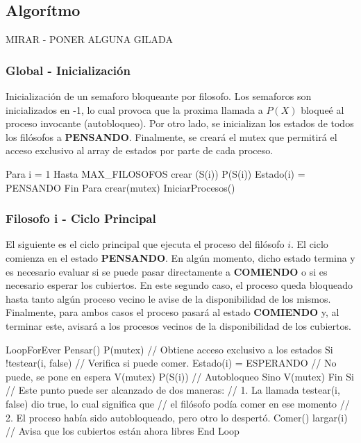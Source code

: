 \subsection{Algorítmo}
MIRAR - PONER ALGUNA GILADA

\subsubsection{Global - Inicialización}
Inicialización de un semaforo bloqueante por filosofo. Los semaforos son inicializados en -1,
lo cual provoca que la proxima llamada a $P(X)$ bloqueé al proceso invocante (autobloqueo).
Por otro lado, se inicializan los estados de todos los filósofos a {\bf PENSANDO}.
Finalmente, se crear\'a el mutex que permitirá el acceso exclusivo al array de estados por parte de cada proceso.

\begin{scriptsize} 
\begin{verbatimtab} 
	Para i = 1 Hasta MAX_FILOSOFOS
		crear (S(i))
		P(S(i))
		Estado(i) = PENSANDO
	Fin Para
	crear(mutex)
	IniciarProcesos()	
\end{verbatimtab}
\end{scriptsize}

\subsubsection{Filosofo i - Ciclo Principal}
El siguiente es el ciclo principal que ejecuta el proceso del filósofo $i$. El ciclo comienza en el estado {\bf PENSANDO}. 
En algún momento, dicho estado termina y es necesario evaluar si se puede pasar directamente a 
{\bf COMIENDO} o si es necesario esperar los cubiertos.  En este segundo caso, el proceso queda bloqueado 
hasta tanto algún proceso vecino le avise de la disponibilidad de los mismos. Finalmente, para ambos 
casos el proceso pasará al estado {\bf COMIENDO} y, al terminar este, avisará a los procesos vecinos 
de la disponibilidad de los cubiertos.

\begin{scriptsize} 
\begin{verbatimtab} 
	LoopForEver
		Pensar()			
		P(mutex)			        // Obtiene acceso exclusivo a los estados
		Si !testear(i, false)		// Verifica si puede comer. 
			Estado(i) = ESPERANDO	// No puede, se pone en espera
			V(mutex)
			P(S(i))			        // Autobloqueo
		Sino
			V(mutex)
		Fin Si		
		// Este punto puede ser alcanzado de dos maneras: 
		// 1. La llamada testear(i, false) dio true, lo cual significa que 
		// el filósofo podía comer en ese momento
		// 2. El proceso había sido autobloqueado, pero otro lo despertó.
		Comer()
		largar(i)                   // Avisa que los cubiertos están ahora libres
	End Loop
\end{verbatimtab}
\end{scriptsize}

